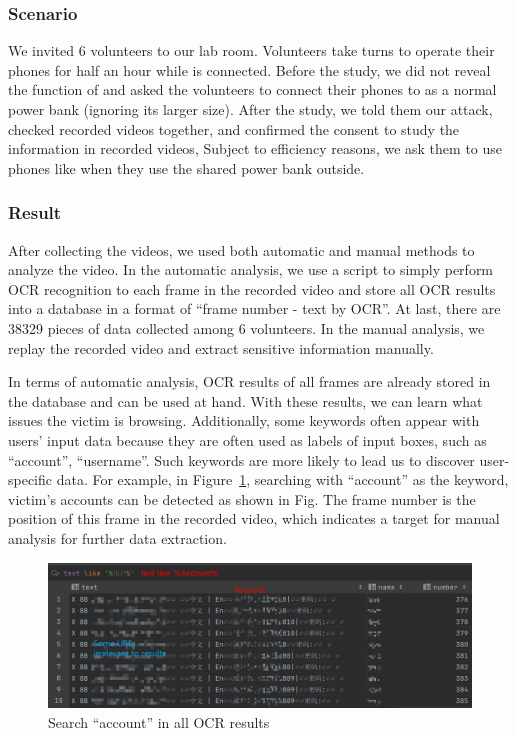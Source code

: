 \subsubsection{Scenario}

We invited 6 volunteers to our lab room. Volunteers take turns to operate their phones for half an hour while \tool is connected. Before the study, we did not reveal the function of \tool and asked the volunteers to connect their phones to \tool as a normal power bank (ignoring its larger size). 
After the study, we told them our attack, checked recorded videos together, and confirmed the consent to study the information in recorded videos, Subject to efficiency reasons, we ask them to use phones like when they use the shared power bank outside.


\subsubsection{Result}

After collecting the videos, we used both automatic and manual methods to analyze the video. In the automatic analysis, we use a script to simply perform OCR recognition to each frame in the recorded video and store all OCR results into a database in a format of ``frame number - text by OCR''. At last, there are 38329 pieces of data collected among 6 volunteers. In the manual analysis, we replay the recorded video and extract sensitive information manually.

In terms of automatic analysis, OCR results of all frames are already stored in the database and can be used at hand. With these results, we can learn what issues the victim is browsing. Additionally, some keywords often appear with users' input data because they are often used as labels of input boxes, such as ``account'', ``username''. Such keywords are more likely to lead us to discover user-specific data. For example, in Figure~\ref{fig:ocr_keyword_example}, searching with ``account'' as the keyword, victim's accounts can be detected as shown in Fig. The frame number is the position of this frame in the recorded video, which indicates a target for manual analysis for further data extraction.

\begin{figure}[hbtp]
	\centering
	\includegraphics[width=\linewidth]{./Figs/ocr_keyword_example.png}
	\caption{Search ``account'' in all OCR results}
	\label{fig:ocr_keyword_example}
\end{figure}

